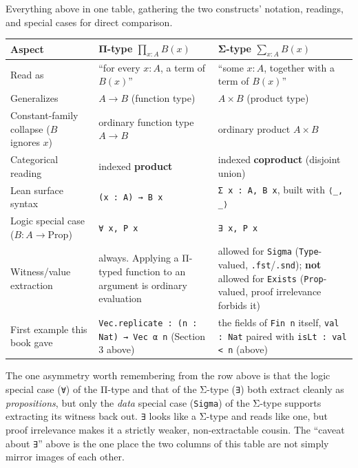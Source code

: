 Everything above in one table, gathering the two constructs' notation, readings, and special cases for direct comparison.

\begin{longtable}[]{@{}
  >{\raggedright\arraybackslash}p{}
  >{\raggedright\arraybackslash}p{}
  >{\raggedright\arraybackslash}p{}@{}}
\toprule\noalign{}
\begin{minipage}[b]{\linewidth}\raggedright
Aspect
\end{minipage} & \begin{minipage}[b]{\linewidth}\raggedright
Π-type \(\prod_{x:A} B(x)\)
\end{minipage} & \begin{minipage}[b]{\linewidth}\raggedright
Σ-type \(\sum_{x:A} B(x)\)
\end{minipage} \\
\midrule\noalign{}
\endhead
\bottomrule\noalign{}
\endlastfoot
Read as & ``for every \(x:A\), a term of \(B(x)\)'' & ``some \(x:A\), together with a term of \(B(x)\)'' \\
Generalizes & \(A \to B\) (function type) & \(A \times B\) (product type) \\
Constant-family collapse (\(B\) ignores \(x\)) & ordinary function type \(A \to B\) & ordinary product \(A \times B\) \\
Categorical reading & indexed \textbf{product} & indexed \textbf{coproduct} (disjoint union) \\
Lean surface syntax & \texttt{(x : A) → B x} & \texttt{Σ x : A, B x}, built with \texttt{⟨\_\allowbreak{}, \_\allowbreak{}⟩} \\
Logic special case (\(B : A \to \mathrm{Prop}\)) & \texttt{∀ x, P x} & \texttt{∃ x, P x} \\
Witness/value extraction & always. Applying a Π-typed function to an argument is ordinary evaluation & allowed for \texttt{Sigma} (\texttt{Type}-valued, \texttt{.fst}/\texttt{.snd}); \textbf{not} allowed for \texttt{Exists} (\texttt{Prop}-valued, proof irrelevance forbids it) \\
First example this book gave & \texttt{Vec.replicate : (n : Nat) → Vec α n} (Section 3 above) & the fields of \texttt{Fin n} itself, \texttt{val : Nat} paired with \texttt{isLt : val < n} (above) \\
\end{longtable}

The one asymmetry worth remembering from the row above is that the logic special case (\texttt{∀}) of the Π-type and that of the Σ-type (\texttt{∃}) both extract cleanly as \emph{propositions}, but only the \emph{data} special case (\texttt{Sigma}) of the Σ-type supports extracting its witness back out. \texttt{∃} looks like a Σ-type and reads like one, but proof irrelevance makes it a strictly weaker, non-extractable cousin. The ``caveat about \texttt{∃}'' above is the one place the two columns of this table are not simply mirror images of each other.

